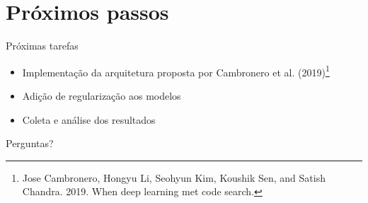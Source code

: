 \documentclass[10pt]{beamer}
\begin{document}
\section{Próximos passos}

\begin{frame}{Próximas tarefas}
    \begin{itemize}
        \item Implementação da arquitetura proposta por Cambronero et al. (2019)\footnote{Jose Cambronero, Hongyu Li, Seohyun Kim, Koushik Sen, and Satish Chandra. 2019. When deep learning met code search.}
        \item Adição de regularização aos modelos
        \item Coleta e análise dos resultados
    \end{itemize}
\end{frame}


{
\begin{frame}[standout]
  Perguntas?
\end{frame}
}

\appendix
\end{document}
